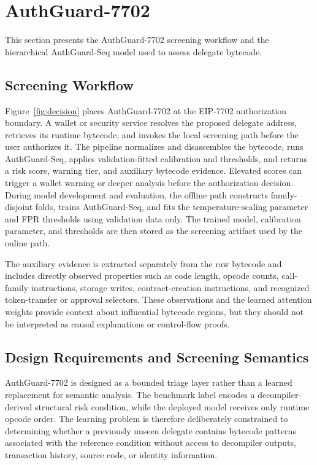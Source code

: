 \documentclass[conference]{IEEEtran}
\begin{document}
\section{AuthGuard-7702}
\label{sec:system}
This section presents the AuthGuard-7702 screening workflow and the hierarchical AuthGuard-Seq model used to assess delegate bytecode.



\subsection{Screening Workflow}

Figure~\ref{fig:decision} places AuthGuard-7702 at the EIP-7702 authorization boundary. A wallet or security service resolves the proposed delegate address, retrieves its runtime bytecode, and invokes the local screening path before the user authorizes it. The pipeline normalizes and disassembles the bytecode, runs AuthGuard-Seq, applies validation-fitted calibration and thresholds, and returns a risk score, warning tier, and auxiliary bytecode evidence. Elevated scores can trigger a wallet warning or deeper analysis before the authorization decision. During model development and evaluation, the offline path constructs family-disjoint folds, trains AuthGuard-Seq, and fits the temperature-scaling parameter and FPR thresholds using validation data only. The trained model, calibration parameter, and thresholds are then stored as the screening artifact used by the online path.



The auxiliary evidence is extracted separately from the raw bytecode and includes directly observed properties such as code length, opcode counts, call-family instructions, storage writes, contract-creation instructions, and recognized token-transfer or approval selectors. These observations and the learned attention weights provide context about influential bytecode regions, but they should not be interpreted as causal explanations or control-flow proofs.

\subsection{Design Requirements and Screening Semantics}

AuthGuard-7702 is designed as a bounded triage layer rather than a learned replacement for semantic analysis. The benchmark label encodes a decompiler-derived structural risk condition, while the deployed model receives only runtime opcode order. The learning problem is therefore deliberately constrained to determining whether a previously unseen delegate contains bytecode patterns associated with the reference condition without access to decompiler outputs, transaction history, source code, or identity information.
\end{document}
